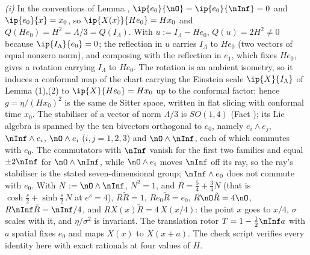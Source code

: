 \emph{(i)} In the conventions of Lemma , $\ip{e_{0}}{\nO} = \ip{e_{0}}{\nInf} = 0$ and $\ip{e_{0}}{x} = x_{0}$, so $\ip{X(x)}{He_{0}} = Hx_{0}$ and $Q(He_{0}) = H^{2} = \Lambda/3 = Q(I_{\Lambda})$. With $u := I_{\Lambda} - He_{0}$, $Q(u) = 2H^{2} \neq 0$ because $\ip{I_{\Lambda}}{e_{0}} = 0$; the reflection in $u$ carries $I_{\Lambda}$ to $He_{0}$ (two vectors of equal nonzero norm), and composing with the reflection in $e_{1}$, which fixes $He_{0}$, gives a rotation carrying $I_{\Lambda}$ to $He_{0}$. The rotation is an ambient isometry, so it induces a conformal map of the chart carrying the Einstein scale $\ip{X}{I_{\Lambda}}$ of Lemma (1),(2) to $\ip{X}{He_{0}} = Hx_{0}$ up to the conformal factor; hence $g = \eta/(Hx_{0})^{2}$ is the same de Sitter space, written in flat slicing with conformal time $x_{0}$. The stabiliser of a vector of norm $\Lambda/3$ is $SO(1,4)$ (Fact ); its Lie algebra is spanned by the ten bivectors orthogonal to $e_{0}$, namely $e_{i}\wedge e_{j}$, $\nInf\wedge e_{i}$, $\nO\wedge e_{i}$ ($i, j = 1, 2, 3$) and $\nO\wedge\nInf$, each of which commutes with $e_{0}$. The commutators with $\nInf$ vanish for the first two families and equal $\pm 2\nInf$ for $\nO\wedge\nInf$, while $\nO\wedge e_{i}$ moves $\nInf$ off its ray, so the ray's stabiliser is the stated seven-dimensional group; $\nInf\wedge e_{0}$ does not commute with $e_{0}$. With $N := \nO\wedge\nInf$, $N^{2} = 1$, and $R = \tfrac54 + \tfrac34 N$ (that is $\cosh\tfrac s2 + \sinh\tfrac s2\,N$ at $e^{s} = 4$), $R\tilde R = 1$, $Re_{0}\tilde R = e_{0}$, $R\nO\tilde R = 4\nO$, $R\nInf\tilde R = \nInf/4$, and $R X(x)\tilde R = 4\,X(x/4)$: the point $x$ goes to $x/4$, $\sigma$ scales with it, and $\eta/\sigma^{2}$ is invariant. The translation rotor $T = 1 - \tfrac12\nInf a$ with $a$ spatial fixes $e_{0}$ and maps $X(x)$ to $X(x + a)$. The check script verifies every identity here with exact rationals at four values of $H$.

